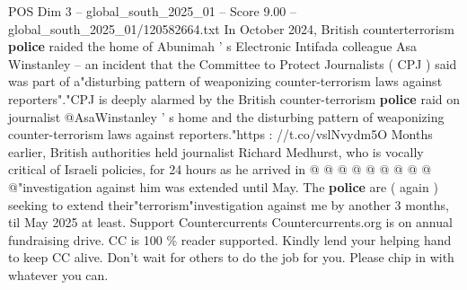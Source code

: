 \begin{textsample}{POS Dim 3 – global\_south\_2025\_01 – Score 9.00 – global\_south\_2025\_01/120582664.txt}
In October 2024, British counterterrorism \textbf{police} raided the home of Abunimah ' s Electronic Intifada colleague Asa Winstanley -- an incident that the Committee to Protect Journalists ( CPJ ) said was part of a"disturbing pattern of weaponizing counter-terrorism laws against reporters"."CPJ is deeply alarmed by the British counter-terrorism \textbf{police} raid on journalist @AsaWinstanley ' s home and the disturbing pattern of weaponizing counter-terrorism laws against reporters."https : //t.co/vslNvydm5O Months earlier, British authorities held journalist Richard Medhurst, who is vocally critical of Israeli policies, for 24 hours as he arrived in @ @ @ @ @ @ @ @ @ @"investigation against him was extended until May.
The \textbf{police} are ( again ) seeking to extend their"terrorism"investigation against me by another 3 months, til May 2025 at least.
Support Countercurrents Countercurrents.org is on annual fundraising drive.
CC is 100 \% reader supported.
Kindly lend your helping hand to keep CC alive.
Don't wait for others to do the job for you.
Please chip in with whatever you can.

\end{textsample}
